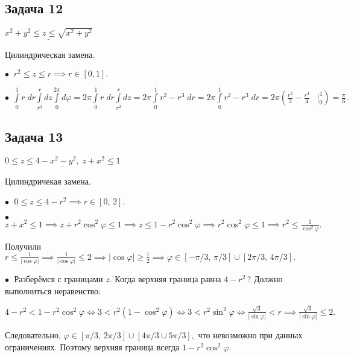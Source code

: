 \documentclass[a4paper, fleqn]{article}
\begin{document}
    \subsection*{Задача 12}

    $\underline{x^2 + y^2 \leq z \leq \sqrt{x^2 + y^2}}$

    Цилиндрическая замена.

    $\bullet \; \; r^2 \leq z \leq r \implies r \in [0, 1].$

    $\bullet \; \, \int\limits_{0}^{1} r \; dr \int\limits_{r^2}^{r} dz \int\limits_{0}^{2 \pi} d \varphi =  2 \pi  \int\limits_{0}^{1} r \; dr \int\limits_{r^2}^{r} dz  =
      2 \pi  \int\limits_{0}^{1} r^2 - r^3 \; dr = 2 \pi  \int\limits_{0}^{1} r^2 - r^3 \; dr = 2 \pi \left( \frac{r^3}{3} - \frac{r^4}{4} \; \; \;
      \Bigg|_{0}^{1} \right) = \boxed{\frac{\pi}{6}} \, .$

    \subsection*{Задача 13} 
    
    $\underline{0 \leq z \leq 4 - x^2 - y^2, \; z + x^2 \leq 1}$
    
    Цилиндричекая замена.
    
    $\bullet \; $ $0 \leq z \leq 4 - r^2 \implies r \in [0, \, 2].$
    
    $\bullet \; $ $z + x^2 \leq 1 \implies z + r^2 \cos^2 \varphi \leq 1 \implies z \leq 1 - r^2 \cos^2 \varphi \implies r^2 \cos^2 \varphi \leq 1 \implies r^2 \leq \frac{1}{\cos^2 \varphi  }.$
    
    
    Получили $r \leq \frac{1}{|\cos \varphi|} \implies  \frac{1}{|\cos \varphi|} \leq 2\implies |\cos \varphi|\geq \frac{1}{2} \implies \varphi \in  [-\pi/3, \, \pi/3] \cup [2 \pi / 3, \, 4 \pi / 3].$
    
    
    $\bullet \;$ Разберёмся с границами $z$. Когда верхняя граница равна $4 - r^2 \, $? Должно выполниться неравенство:
    
    $4 - r^2 < 1 - r^2 \cos ^2 \varphi \iff 3 < r^2 (1 - \cos^2 \varphi) \iff 3 < r^2 \sin^2 \varphi \iff \frac{\sqrt{3}}{ |\sin \varphi| } < r \implies  \frac{\sqrt{3}}{ |\sin \varphi| } \leq 2.$
    
    \doublespacing Следовательно, $ \varphi \in [\pi/3, \, 2\pi/3] \cup [4 \pi / 3 \cup 5 \pi / 3],  $ что невозможно при данных ограничениях. Поэтому верхняя граница всегда $1 - r^2 \cos^2 \varphi.$
    
\end{document}
